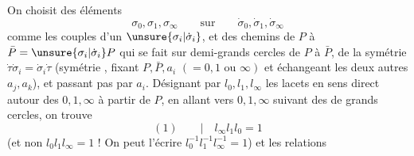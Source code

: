 On choisit des éléments
\[
\sigma_0,\sigma_1,\sigma_\infty\qquad\text{sur}\qquad\dot\sigma_0,\dot\sigma_1,\dot\sigma_\infty
\]
comme les couples d'un $\unsure{\sigma_i|\dot\sigma_i}$, et des chemins  de $P$ à $\bar P=\unsure{\sigma_i|\dot\sigma_i}P$ qui se fait sur   demi-grands cercles de $P$ à $\bar P$,    de la symétrie $\dot\tau\dot\sigma_i=\dot\sigma_i\dot\tau$ (symétrie , fixant $P,\bar P,a_i$ $(=0,1\text{ ou }\infty)$ et échangeant les deux autres $a_j,a_k$), et  passant pas par $a_i$.  Désignant par $l_0,l_1,l_\infty$  les lacets en sens direct autour des $0,1,\infty$ à partir de $P$, en allant vers $0,1,\infty$ suivant des  de grands cercles, on trouve
\[
(1)\qquad\big|\quad l_\infty l_1l_0=1
\]
(et non $l_0l_1l_\infty=1$ !  On peut l'écrire $l_0^{-1}l_1^{-1}l_\infty^{-1}=1$)
et les relations

